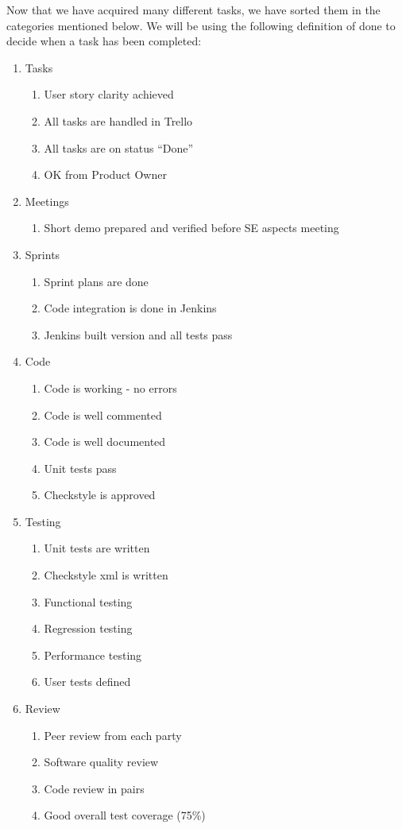 Now that we have acquired many different tasks, we have sorted them in the categories mentioned below. We will be using the following definition of done to decide when a task has been completed:

\begin{enumerate}
\item Tasks
\begin{enumerate}
	 \item User story clarity achieved
	   \item All tasks are handled in Trello
	   \item All tasks are on status ``Done''
	   \item OK from Product Owner
	\end{enumerate}

\item Meetings
\begin{enumerate}
   \item Short demo prepared and verified before SE aspects meeting
\end{enumerate}


\item Sprints
\begin{enumerate}
   \item Sprint plans are done
   \item Code integration is done in Jenkins
   \item Jenkins built version and all tests pass
\end{enumerate}

\item Code
\begin{enumerate}
   \item Code is working - no errors 
   \item Code is well commented
   \item Code is well documented
   \item Unit tests pass
   \item Checkstyle is approved
\end{enumerate}

\item Testing
\begin{enumerate}
   \item Unit tests are written
   \item Checkstyle xml is written
   \item Functional testing
   \item Regression testing
   \item Performance testing
   \item User tests defined
\end{enumerate}

\item Review
\begin{enumerate}
   \item Peer review from each party
   \item Software quality review
   \item Code review in pairs
   \item Good overall test coverage (75\%)
\end{enumerate}	
\end{enumerate}
